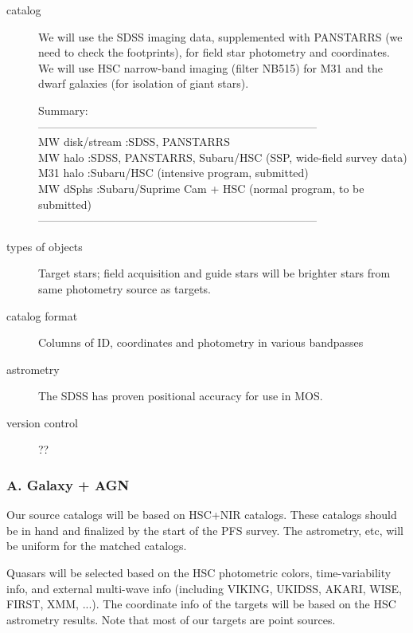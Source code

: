 \documentclass[a4paper,notitlepage]{article}
\begin{document}
\begin{description}
    \item[catalog]
 We will use the SDSS imaging data, supplemented with PANSTARRS
(we need to check the footprints), for field star photometry and
coordinates. We will use HSC narrow-band imaging (filter NB515) for
M31 and the dwarf galaxies (for isolation of giant stars).

 Summary:\\
---------------------------------------------------------------------------\\
 MW disk/stream :SDSS, PANSTARRS\\
 MW halo        :SDSS, PANSTARRS, Subaru/HSC (SSP, wide-field survey data)\\
 M31 halo       :Subaru/HSC (intensive program, submitted)\\
 MW dSphs       :Subaru/Suprime Cam + HSC (normal program, to be submitted)\\
---------------------------------------------------------------------------
    \item[types of objects]
Target stars; field acquisition and guide stars will be brighter stars
from same photometry source as targets.
    \item[catalog format]
Columns of ID, coordinates and photometry in various bandpasses
    \item[astrometry]
The SDSS has proven positional accuracy for use in MOS. 
    \item[version control]
??
\end{description}

\subsubsection{A. Galaxy + AGN}
Our source catalogs will be based on HSC+NIR catalogs. These catalogs 
should be in hand and finalized by the start of the PFS survey. 
The astrometry, etc, will be uniform for the matched catalogs.

Quasars will be selected based on the HSC photometric
colors, time-variability info, and external multi-wave info 
(including VIKING, UKIDSS, AKARI, WISE, FIRST, XMM, ...). The 
coordinate info of the targets will be based on the HSC astrometry 
results. Note that most of our targets are point sources.

\renewcommand{\thesubsection}{Q.2.2-\alph{subsection}}
\setcounter{subsection}{0}
\end{document}
